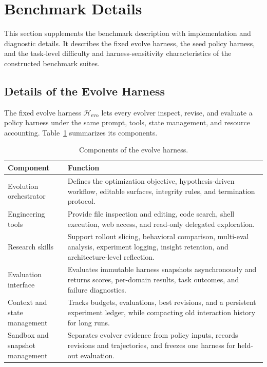 \vspace{1.4ex}
\endgroup

\newpage


\section{Benchmark Details}
\label{app:benchmark-details}

This section supplements the benchmark description with implementation and diagnostic details.  It describes the fixed evolve harness, the seed policy harness, and the task-level difficulty and harness-sensitivity characteristics of the constructed benchmark suites.

\subsection{Details of the Evolve Harness}
\label{app:evolve-harness}

The fixed evolve harness $\mathcal{H}_{\mathrm{evo}}$ lets every evolver inspect,
revise, and evaluate a policy harness under the same prompt, tools, state
management, and resource accounting.  Table~\ref{tab:evolve-harness-components}
summarizes its components.

\begin{table}[htbp]
\centering
\small
\caption{Components of the evolve harness.}
\label{tab:evolve-harness-components}
\begin{tabularx}{\textwidth}{p{} X}
\toprule
\textbf{Component} & \textbf{Function} \\
\midrule
Evolution orchestrator & Defines the optimization objective, hypothesis-driven
workflow, editable surfaces, integrity rules, and termination protocol. \\
Engineering tools & Provide file inspection and editing, code search, shell
execution, web access, and read-only delegated exploration. \\
Research skills & Support rollout slicing, behavioral comparison, multi-eval
analysis, experiment logging, insight retention, and architecture-level
reflection. \\
Evaluation interface & Evaluates immutable harness snapshots asynchronously and
returns scores, per-domain results, task outcomes, and failure diagnostics. \\
\makecell[l]{Context and state\\management} & Tracks budgets, evaluations, best revisions, and a persistent
experiment ledger, while compacting old interaction history for long runs. \\
\makecell[l]{Sandbox and snapshot\\management} & Separates evolver evidence from policy inputs, records
revisions and trajectories, and freezes one harness for held-out evaluation. \\
\bottomrule
\end{tabularx}
\end{table}

